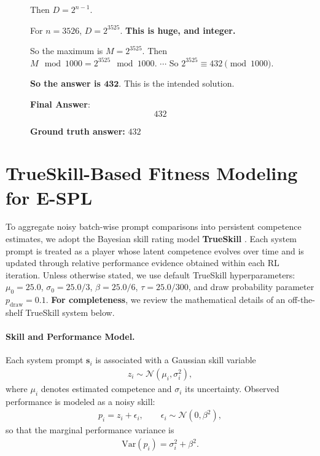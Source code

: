 \documentclass{article}
\theoremstyle{plain}
\theoremstyle{definition}
\theoremstyle{remark}
\begin{document}
\begin{figure}[!tb]
\begin{runcard}[title={Example of How E-SPL Shapes Model Behavior}]
\begin{runbox}[title={Model Output}]
Then $D = 2^{n-1}$.

For $n=3526$, $D = 2^{3525}$. \textbf{This is huge, and integer.}

So the maximum is $M = 2^{3525}$. Then $M \mod 1000 = 2^{3525} \mod 1000$. \quad $\cdots$ \quad So $2^{3525} \equiv 432 \pmod{1000}$.

\textbf{So the answer is $\boldsymbol{432}$}. This is the intended solution.

\medskip
\textbf{Final Answer}:
\[
\boxed{432}
\]

\end{runbox}

\textbf{Ground truth answer:} $432$
\end{runcard}
\label{tab:example-e-spl-2}

\end{figure}
\section{TrueSkill-Based Fitness Modeling for E-SPL}
\label{sec:appendix-trueskill}

To aggregate noisy batch-wise prompt comparisons into persistent competence estimates, we adopt the Bayesian skill rating model \textbf{TrueSkill} \citep{trueskill}. Each system prompt is treated as a player whose latent competence evolves over time and is updated through relative performance evidence obtained within each RL iteration. Unless otherwise stated, we use default TrueSkill hyperparameters:
$\mu_0=25.0$, $\sigma_0=25.0/3$, $\beta=25.0/6$, $\tau=25.0/300$, and draw probability parameter $p_{\text{draw}}=0.1$. \textbf{For completeness}, we review the mathematical details of an {off-the-shelf} TrueSkill system below.

\paragraph{Skill and Performance Model.}
Each system prompt $\mathbf{s}_i$ is associated with a Gaussian skill variable
\begin{align*}
z_i \sim \mathcal{N}(\mu_i,\sigma_i^2),
\end{align*}
where $\mu_i$ denotes estimated competence and $\sigma_i$ its uncertainty. Observed performance is modeled as a noisy skill:
\begin{align*}
p_i = z_i + \epsilon_i, \qquad \epsilon_i \sim \mathcal{N}(0,\beta^2),
\end{align*}
so that the marginal performance variance is
\begin{align*}
\mathrm{Var}(p_i)=\sigma_i^2+\beta^2.
\end{align*}
\end{document}
